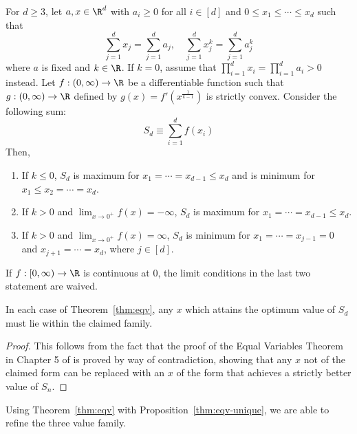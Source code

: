\documentclass[11pt]{article}
\begin{document}
\begin{theorem}\label{thm:eqv}
For $d\geq 3$, let $a,x\in \R^d$ with $a_i\geq 0$ for all $i\in [d]$ and $0\leq x_1\leq \cdots\leq x_d$ such that
$$\sum_{j=1}^{d}x_j=\sum_{j=1}^{d}a_j,\quad \sum_{j=1}^{d}x_j^k =\sum_{j=1}^{d}a_j^k $$
where $a$ is fixed and $k\in \R$. If $k=0$, assume that $\prod_{i=1}^{d}x_i=\prod_{i=1}^{d}a_i>0$ instead. Let $f:(0,\infty)\to \R$ be a differentiable function such that $g:(0,\infty)\to \R$ defined by $g(x)=f'(x^{\frac 1 {k-1}})$ is strictly convex. Consider the following sum:
$$S_d\equiv \sum_{i=1}^{d}f(x_i)$$
Then, 
\begin{enumerate}
    \item If $k\leq 0$, $S_d$ is maximum for $x_1=\cdots=x_{d-1}\leq x_{d}$ and is minimum for $x_1\leq x_2=\cdots=x_d$.
    \item If $k>0$ and $\lim_{x\to 0^+}f(x)= -\infty$, $S_d$ is maximum for $x_1=\cdots=x_{d-1}\leq x_{d}$.
    \item  If $k>0$ and $\lim_{x\to 0^+}f(x)=\infty$, $S_d$ is minimum for $x_1=\cdots =x_{j-1}=0$ and $x_{j+1}=\cdots =x_d$, where $j\in [d]$. 
\end{enumerate}
If $f:[0,\infty)\to \R$ is continuous at $0$, the limit conditions in the last two statement are waived. 
\end{theorem}
\begin{proposition}\label{thm:eqv-unique}
   In each case of Theorem~\ref{thm:eqv}, any $x$ which attains the optimum value of $S_d$ must lie within the claimed family.
\end{proposition}
\begin{proof}
    This follows from the fact that the proof of the Equal Variables Theorem in Chapter 5 of \citep{cirtoaje2006algebraic} is proved by way of contradiction, showing that any $x$ not of the claimed form can be replaced with an $x$ of the form that achieves a strictly better value of $S_n$.
\end{proof}

Using Theorem~\ref{thm:eqv} with Proposition~\ref{thm:eqv-unique}, we are able to refine the three value family.
\end{document}

